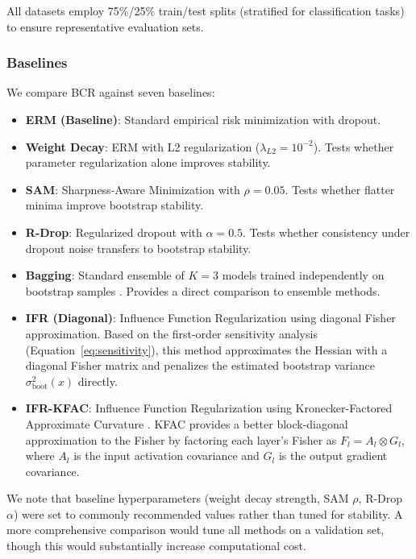 \documentclass[12pt, letterpaper]{article}
\begin{document}
All datasets employ 75\%/25\% train/test splits (stratified for classification tasks) to ensure representative evaluation sets.

\subsubsection{Baselines}

We compare BCR against seven baselines:

\begin{itemize}
\item \textbf{ERM (Baseline)}: Standard empirical risk minimization with dropout.
\item \textbf{Weight Decay}: ERM with L2 regularization ($\lambda_{L2} = 10^{-2}$). Tests whether parameter regularization alone improves stability.
\item \textbf{SAM}: Sharpness-Aware Minimization \citep{foret2020sharpness} with $\rho = 0.05$. Tests whether flatter minima improve bootstrap stability.
\item \textbf{R-Drop}: Regularized dropout \citep{liang2021rdrop} with $\alpha = 0.5$. Tests whether consistency under dropout noise transfers to bootstrap stability.
\item \textbf{Bagging}: Standard ensemble of $K=3$ models trained independently on bootstrap samples \citep{breiman1996bagging}. Provides a direct comparison to ensemble methods.
\item \textbf{IFR (Diagonal)}: Influence Function Regularization using diagonal Fisher approximation. Based on the first-order sensitivity analysis (Equation~\ref{eq:sensitivity}), this method approximates the Hessian with a diagonal Fisher matrix and penalizes the estimated bootstrap variance $\sigma^2_{\text{boot}}(x)$ directly.
\item \textbf{IFR-KFAC}: Influence Function Regularization using Kronecker-Factored Approximate Curvature \citep{martens2015optimizing}. KFAC provides a better block-diagonal approximation to the Fisher by factoring each layer's Fisher as $F_l = A_l \otimes G_l$, where $A_l$ is the input activation covariance and $G_l$ is the output gradient covariance.
\end{itemize}

We note that baseline hyperparameters (weight decay strength, SAM $\rho$, R-Drop $\alpha$) were set to commonly recommended values rather than tuned for stability. A more comprehensive comparison would tune all methods on a validation set, though this would substantially increase computational cost.
\end{document}
